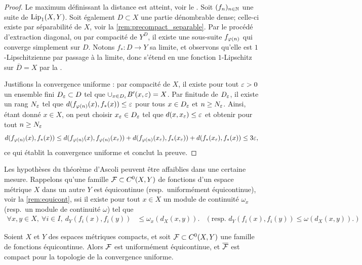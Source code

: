 \begin{proof}
Le maximum définissant la distance est atteint, voir le .
Soit $(f_n)_{n \in \mathbb{N}}$ une suite de $\operatorname{Lip}_1(X,Y)$. Soit également $D \subset X$ une partie dénombrable dense; celle-ci existe par séparabilité de $X$, voir la \cref{rem:precompact_separable}. 
Par le procédé d'extraction diagonal, ou par compacité de $Y^D$, il existe une sous-suite $f_{\varphi(n)}$ qui converge simplement sur $D$. Notons $f_* : D \to Y$ sa limite, et observons qu'elle est $1$-Lipschitzienne par passage à la limite, donc s'étend en une fonction $1$-Lipschitz sur $\overline D = X$ par la .

Justifions la convergence uniforme : par compacité de $X$, il existe pour tout $\varepsilon>0$ un ensemble fini $D_\varepsilon \subset D$ tel que $\cup_{x \in D_\varepsilon} B'(x,\varepsilon) = X$. 
Par finitude de $D_\varepsilon$, il existe un rang $N_\varepsilon$ tel que $d(f_{\varphi(n)}(x), f_*(x)) \leq \varepsilon$ pour tous $x \in D_\varepsilon$ et $n \geq N_\varepsilon$. Ainsi, étant donné $x \in X$, on peut choisir $x_\varepsilon\in D_\varepsilon$ tel que $d(x,x_\varepsilon) \leq \varepsilon$ et obtenir pour tout $n \geq N_\varepsilon$
\begin{equation*}
	d(f_{\varphi(n)}(x), f_*(x)) \leq d(f_{\varphi(n)}(x), f_{\varphi(n)}(x_\varepsilon)) + d(f_{\varphi(n)}(x_\varepsilon), f_*(x_\varepsilon)) + d(f_*(x_\varepsilon), f_*(x)) \leq 3 \varepsilon,
\end{equation*}
ce qui établit la convergence uniforme et conclut la preuve. 
\end{proof}

Les hypothèses du théorème d'Ascoli peuvent être affaiblies dans une certaine mesure.
Rappelons qu'une famille $\mathcal{F} \subset C^0(X,Y)$ de fonctions d'un espace métrique $X$ dans un autre $Y$ est équicontinue (resp.\ uniformément équicontinue), voir la \cref{rem:equicont},  ssi il existe pour tout $x \in X$ un module de continuité $\omega_x$ (resp.\ un module de continuité $\omega$) tel que 
\begin{align*}
	\forall x,y \in X,\ \forall i \in I,\ d_Y(f_i(x),f_i(y)) &\leq \omega_x (d_X(x,y)). &
	(\text{resp. } d_Y(f_i(x),f_i(y)) \leq \omega(d_X(x,y)). )
\end{align*}

\begin{corollary}
\label{corol:AscoliEquicont}
%
	Soient $X$ et $Y$ des espaces métriques compacts, et soit $\mathcal{F} \subset C^0(X,Y)$ une famille de fonctions équicontinue. Alors $\mathcal{F}$ est uniformément équicontinue, et $\overline {\mathcal{F}}$ est compact pour la topologie de la convergence uniforme. 
\end{corollary}

